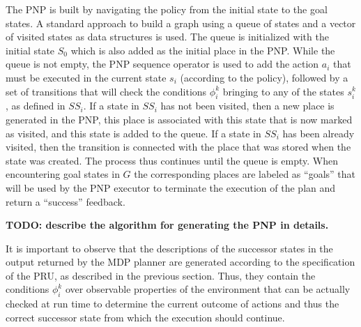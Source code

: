 The PNP is built by navigating the policy from the initial state to the goal states.
A standard approach to build a graph using a queue of states and a vector of visited states as data structures is used.
The queue is initialized with the initial state $S_0$ which is also added as the initial place in the PNP.
While the queue is not empty, the PNP sequence operator is used to add the action $a_i$ that must be executed in the current state $s_i$ (according to the policy), followed by a set of transitions that will check the conditions $\phi_i^k$ bringing to any of the states $s_i^k$, as defined in $SS_i$. 
If a state in $SS_i$ has not been visited, then a new place is generated in the PNP, this place is associated with this state that is now marked as visited, and this state is added to the queue. If a state in $SS_i$ has been already visited, then the transition is connected with the place that was stored when the state was created. The process thus continues until the queue is empty.
When encountering goal states in $G$ the corresponding places are labeled as ``goals'' that will be used by the PNP executor to terminate the execution of the plan and return a ``success'' feedback.

\vspace{0.5cm}
{\bf TODO: describe the algorithm for generating the PNP in details.}
\vspace{0.5cm}


It is important to observe that the descriptions of the successor states in the output returned by the MDP planner are generated according to the specification of the PRU, as described in the previous section. Thus, they contain the conditions $\phi_i^k$ over observable properties of the environment that can be actually checked at run time to determine the current outcome of actions and thus the correct successor state from which the execution should continue.


